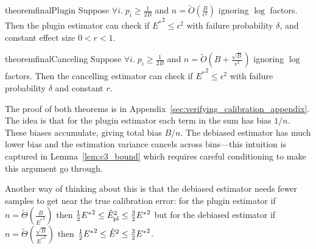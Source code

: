 \begin{restatable}{theorem}{finalPlugin}
\label{thm:final-plugin}
  Suppose  $\forall i.\;p_i \geq \frac{1}{2B}$ and $n = \widetilde{O}(\frac{B}{\epsilon^2})$ ignoring $\log$ factors. Then the plugin estimator can check if ${E^*}^2 \leq \epsilon^2$ with failure probability $\delta$, and constant effect size $0 < r < 1$. 
\end{restatable}

\begin{restatable}{theorem}{finalCanceling}
\label{thm:final-ours}
  Suppose $\forall i.\;p_i \geq \frac{1}{2B}$ and $n = \widetilde{O}(B+\frac{\sqrt{B}}{\epsilon^2})$ ignoring $\log$ factors. Then the cancelling  estimator can check if ${E^*}^2 \leq \epsilon^2$ with failure probability $\delta$ and constant $r$. 
\end{restatable}

The proof of both theorems is in Appendix~\ref{sec:verifying_calibration_appendix}. The idea is that for the plugin estimator each term in the sum has bias $1/n$. These biases accumulate, giving total bias $B/n$. The debiased estimator has much lower bias and the estimation variance cancels across bins---this intuition is captured in Lemma~\ref{lem:c3_bound} which requires careful conditioning to make this  argument go through.

Another way of thinking about this  is that the debiased estimator needs fewer samples to get near the true calibration error: for the plugin estimator if $n = \widetilde{\Theta}(\frac{B}{{E^*}^2})$ then $\frac{1}{2} {E^*}^2 \leq \hat{E}_{\textup{pl}}^2{} \leq \frac{3}{2} {E^*}^2$ but for the debiased estimator if $n = \widetilde{\Theta}(\frac{\sqrt{B}}{{E^*}^2})$ then $\frac{1}{2} {E^*}^2 \leq \hat{E}^2{} \leq \frac{3}{2}{E^*}^2$.

